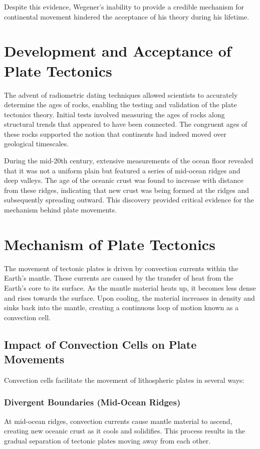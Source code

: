 \documentclass{article}
\begin{document}
Despite this evidence, Wegener's inability to provide a credible mechanism for continental movement hindered the acceptance of his theory during his lifetime.

\section{Development and Acceptance of Plate Tectonics}

The advent of radiometric dating techniques allowed scientists to accurately determine the ages of rocks, enabling the testing and validation of the plate tectonics theory. Initial tests involved measuring the ages of rocks along structural trends that appeared to have been connected. The congruent ages of these rocks supported the notion that continents had indeed moved over geological timescales.

During the mid-20th century, extensive measurements of the ocean floor revealed that it was not a uniform plain but featured a series of mid-ocean ridges and deep valleys. The age of the oceanic crust was found to increase with distance from these ridges, indicating that new crust was being formed at the ridges and subsequently spreading outward. This discovery provided critical evidence for the mechanism behind plate movements.

\section{Mechanism of Plate Tectonics}

The movement of tectonic plates is driven by convection currents within the Earth's mantle. These currents are caused by the transfer of heat from the Earth's core to its surface. As the mantle material heats up, it becomes less dense and rises towards the surface. Upon cooling, the material increases in density and sinks back into the mantle, creating a continuous loop of motion known as a convection cell.

\subsection{Impact of Convection Cells on Plate Movements}

Convection cells facilitate the movement of lithospheric plates in several ways:

\subsubsection{Divergent Boundaries (Mid-Ocean Ridges)}
At mid-ocean ridges, convection currents cause mantle material to ascend, creating new oceanic crust as it cools and solidifies. This process results in the gradual separation of tectonic plates moving away from each other.
\end{document}
